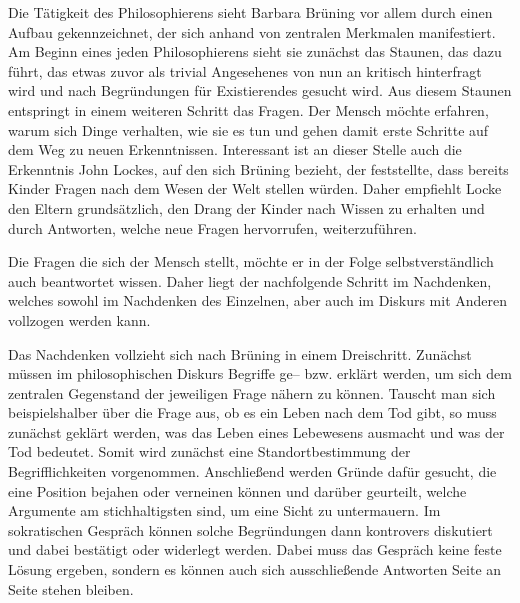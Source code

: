 Die Tätigkeit des Philosophierens sieht Barbara Brüning vor allem durch einen Aufbau gekennzeichnet, der sich anhand von zentralen Merkmalen manifestiert. 
Am Beginn eines jeden Philosophierens sieht sie zunächst das Staunen, das dazu führt, das etwas zuvor als trivial Angesehenes von nun an kritisch hinterfragt wird und nach Begründungen für Existierendes gesucht wird. 
Aus diesem Staunen entspringt in einem weiteren Schritt das Fragen. 
Der Mensch möchte erfahren, warum sich Dinge verhalten, wie sie es tun und gehen damit \glqq erste Schritte auf dem Weg zu neuen Erkenntnissen\grqq{}\cite[S.\,10]{BB10}. 
Interessant ist an dieser Stelle auch die Erkenntnis John Lockes, auf den sich Brüning bezieht, der feststellte, dass bereits Kinder Fragen nach dem Wesen der Welt stellen würden. 
Daher empfiehlt Locke den Eltern grundsätzlich, den Drang der Kinder nach Wissen zu erhalten und durch Antworten, welche neue Fragen hervorrufen, weiterzuführen.

Die Fragen die sich der Mensch stellt, möchte er in der Folge selbstverständlich auch beantwortet wissen. 
Daher liegt der nachfolgende Schritt im Nachdenken, welches sowohl im Nachdenken des Einzelnen, aber auch im Diskurs mit Anderen vollzogen werden kann. 

Das Nachdenken vollzieht sich nach Brüning in einem Dreischritt. 
Zunächst müssen im philosophischen Diskurs Begriffe ge-- bzw. erklärt werden, um sich dem zentralen Gegenstand der jeweiligen Frage nähern zu können. 
Tauscht man sich beispielshalber über die Frage aus, ob es ein Leben nach dem Tod gibt, so muss zunächst geklärt werden, was das Leben eines Lebewesens ausmacht und was der Tod bedeutet. 
Somit wird zunächst eine Standortbestimmung der Begrifflichkeiten vorgenommen. 
Anschließend werden Gründe dafür gesucht, die eine Position bejahen oder verneinen können und darüber geurteilt, welche Argumente am stichhaltigsten sind, um eine Sicht zu untermauern. 
Im sokratischen Gespräch können solche Begründungen dann kontrovers diskutiert und dabei bestätigt oder widerlegt werden. 
Dabei muss das Gespräch keine feste Lösung ergeben, sondern es können auch sich ausschließende Antworten Seite an Seite stehen bleiben\cite[S.\,11]{BB10}.

